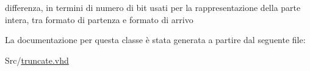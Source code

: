 differenza, in termini di numero di bit usati per la rappresentazione della parte intera, tra formato di partenza e formato di arrivo 



La documentazione per questa classe è stata generata a partire dal seguente file\+:\begin{DoxyCompactItemize}
\item 
Src/\hyperlink{truncate_8vhd}{truncate.\+vhd}\end{DoxyCompactItemize}
